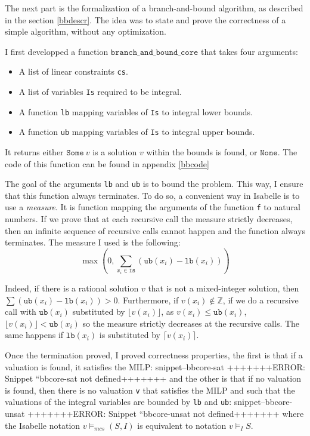 \documentclass{article}
\newcommand{\ints}{\mathbb{Z}}
\newcommand{\Snippet}[1]{%
  \ifcsname snippet--#1\endcsname{\csname snippet--#1\endcsname}%
  \else+++++++ERROR: Snippet ``#1 not defined+++++++ \fi}
\begin{document}
The next part is the formalization of a branch-and-bound algorithm, as
described in the section \ref{bbdescr}. The idea was to state and prove the
correctness of a simple algorithm, without any optimization.

I first developped a function $\mathtt{branch\_and\_bound\_core}$ that takes
four arguments:
\begin{itemize}
  \item A list of linear constraints \texttt{cs}.
  \item A list of variables \texttt{Is} required to be integral.
  \item A function \texttt{lb} mapping variables of \texttt{Is} to integral
    lower bounds.
  \item A function \texttt{ub} mapping variables of \texttt{Is} to integral
    upper bounds.
\end{itemize}
It returns either $\mathtt{Some}~v$ is a solution $v$ within the bounds is
found, or $\mathtt{None}$.
The code of this function can be found in appendix \ref{bbcode}

The goal of the arguments \texttt{lb} and \texttt{ub} is to bound the problem.
This way, I ensure that this function always terminates. To do so, a
convenient way in Isabelle is to use a \textit{measure}. It is function mapping
the arguments of the function \texttt{f} to natural numbers. If we prove that
at each recursive call the measure strictly decreases, then
an infinite sequence of recursive calls cannot happen and the function always
terminates. The measure I used is the following:
$$
\max\left(
     0,
     \sum_{x_i \in \mathtt{Is}} (\mathtt{ub}(x_i) - \mathtt{lb}(x_i))
     \right)
$$

Indeed, if there is a rational solution $v$ that is not a mixed-integer
solution, then $\sum (\mathtt{ub}(x_i) - \mathtt{lb}(x_i)) > 0$.
Furthermore, if $v(x_i) \notin \ints$, if we do a recursive call with
$\mathtt{ub}(x_i)$ substituted by $\lfloor v(x_i) \rfloor$, as
$v(x_i) \leqslant \mathtt{ub}(x_i)$,
$\lfloor v(x_i) \rfloor < \mathtt{ub}(x_i)$ so the measure strictly decreases
at the recursive calls. The same happens if $\mathtt{lb}(x_i)$ is substituted
by $\lceil v(x_i) \rceil$.

Once the termination proved, I proved correctness properties, the first is that
if a valuation is found, it satisfies the MILP:
\Snippet{bbcore-sat}
and the other is that if no valuation is found, then there is no valuation
\texttt{v} that satisfies the MILP and such that the valuations of the integral
variables are bounded by \texttt{lb} and \texttt{ub}:
\Snippet{bbcore-unsat}
where the Isabelle notation $v \vDash_{mcs} (S, I)$ is equivalent to notation
$v \vDash_I S$.
\end{document}
